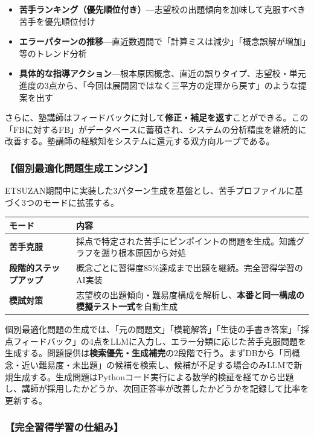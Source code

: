 \documentclass[paper=a4,fontsize=10.5bp,jafontsize=10.5bp,twocolumn]{jlreq}
\begin{document}
\begin{itemize}
  \item \textbf{苦手ランキング（優先順位付き）}---志望校の出題傾向を加味して克服すべき苦手を優先順位付け
  \item \textbf{エラーパターンの推移}---直近数週間で「計算ミスは減少」「概念誤解が増加」等のトレンド分析
  \item \textbf{具体的な指導アクション}---根本原因概念、直近の誤りタイプ、志望校・単元進度の3点から、「今回は展開図ではなく三平方の定理から戻す」のような提案を出す
\end{itemize}

さらに、塾講師はフィードバックに対して\textbf{修正・補足を返す}ことができる。この「FBに対するFB」がデータベースに蓄積され、システムの分析精度を継続的に改善する。塾講師の経験知をシステムに還元する双方向ループである。

\subsubsection{【個別最適化問題生成エンジン】}

ETSUZAN期間中に実装した3パターン生成を基盤とし、苦手プロファイルに基づく3つのモードに拡張する。

\begin{scriptsize}\noindent
\begin{tabularx}{\linewidth}{>{\bfseries}l X}
\toprule
モード & 内容 \\
\midrule
苦手克服 & 採点で特定された苦手にピンポイントの問題を生成。知識グラフを遡り根本原因から対処 \\
段階的ステップアップ & 概念ごとに習得度85\%達成まで出題を継続。完全習得学習のAI実装 \\
模試対策 & 志望校の出題傾向・難易度構成を解析し、\textbf{本番と同一構成の模擬テスト一式}を自動生成 \\
\bottomrule
\end{tabularx}
\end{scriptsize}

個別最適化問題の生成では、「元の問題文」「模範解答」「生徒の手書き答案」「採点フィードバック」の4点をLLMに入力し、エラー分類に応じた苦手克服問題を生成する。問題提供は\textbf{検索優先・生成補完}の2段階で行う。まずDBから「同概念・近い難易度・未出題」の候補を検索し、候補が不足する場合のみLLMで新規生成する。生成問題はPythonコード実行による数学的検証を経てから出題し、講師が採用したかどうか、次回正答率が改善したかどうかを記録して比率を更新する。

\subsubsection{【完全習得学習の仕組み】}
\end{document}
